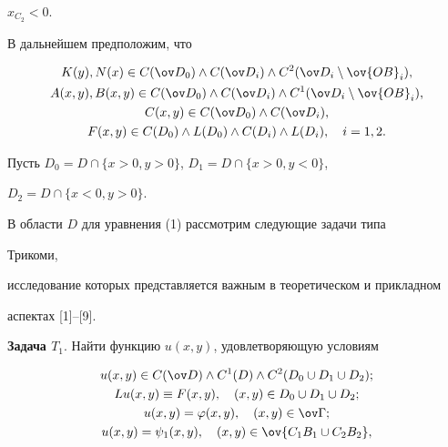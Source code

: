 $x_{C_2}<0.$





В дальнейшем предположим, что 


\begin{gather*}


K(y), N(x)\in C(\ov D_0)\land C(\ov D_i)\land C^2(\ov


D_i\setminus \ov {OB}_i),\\


%


A(x,y),B(x,y)\in C(\ov D_0)\land C(\ov D_i)\land 


C^1(\ov D_i\setminus \ov {OB}_i),\\


%


C(x,y)\in C(\ov D_0)\land C(\ov D_i),\\


%


F(x,y)\in C(D_0)\land L(D_0)\land C(D_i)\land L(D_i),\quad i=1,2.


\end{gather*}


Пусть $D_0=D\cap \{ x>0,y>0\}$, $D_1=D\cap \{ x>0, y<0\}$, 


$D_2=D\cap \{ x<0, y>0\}$.





В области $D$ для уравнения (1) рассмотрим следующие задачи типа 


Трикоми, 


исследование которых представляется важным в теоретическом и прикладном 


аспектах [1]--[9].








{\bf Задача $T_1.$} Найти функцию $u(x,y)$, удовлетворяющую условиям


\begin{gather}


u(x,y)\in C(\ov D)\land C^1(D)\land C^2(D_0\cup D_1\cup D_2);\\


%


Lu(x,y)\equiv F(x,y),\quad (x,y)\in D_0\cup D_1\cup D_2;\\


%


u(x,y)=\varphi (x,y), \quad (x,y)\in \ov \Gamma;\\


%


u(x,y)=\psi _1(x,y), \quad (x,y)\in \ov {C_1B_1\cup C_2B_2},\notag


\end{gather}


